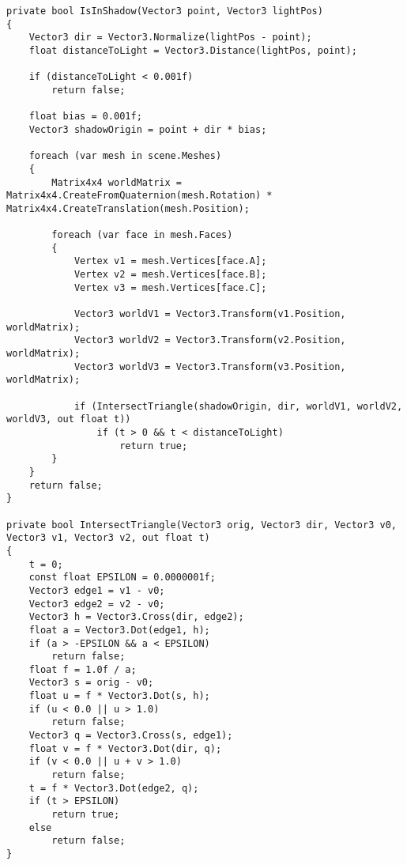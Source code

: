 \begin{center}
\captionsetup{justification=raggedright,singlelinecheck=off}
\begin{lstlisting}[label=lst:shadow,caption=Реализация алгоритма проверки затенения точки объектом,numbers=none]
private bool IsInShadow(Vector3 point, Vector3 lightPos)
{
    Vector3 dir = Vector3.Normalize(lightPos - point);
    float distanceToLight = Vector3.Distance(lightPos, point);

    if (distanceToLight < 0.001f)
        return false;

    float bias = 0.001f;
    Vector3 shadowOrigin = point + dir * bias;

    foreach (var mesh in scene.Meshes)
    {
        Matrix4x4 worldMatrix = Matrix4x4.CreateFromQuaternion(mesh.Rotation) * Matrix4x4.CreateTranslation(mesh.Position);

        foreach (var face in mesh.Faces)
        {
            Vertex v1 = mesh.Vertices[face.A];
            Vertex v2 = mesh.Vertices[face.B];
            Vertex v3 = mesh.Vertices[face.C];

            Vector3 worldV1 = Vector3.Transform(v1.Position, worldMatrix);
            Vector3 worldV2 = Vector3.Transform(v2.Position, worldMatrix);
            Vector3 worldV3 = Vector3.Transform(v3.Position, worldMatrix);

            if (IntersectTriangle(shadowOrigin, dir, worldV1, worldV2, worldV3, out float t))
                if (t > 0 && t < distanceToLight)
                    return true;
        }
    }
    return false;
}

private bool IntersectTriangle(Vector3 orig, Vector3 dir, Vector3 v0, Vector3 v1, Vector3 v2, out float t)
{
    t = 0;
    const float EPSILON = 0.0000001f;
    Vector3 edge1 = v1 - v0;
    Vector3 edge2 = v2 - v0;
    Vector3 h = Vector3.Cross(dir, edge2);
    float a = Vector3.Dot(edge1, h);
    if (a > -EPSILON && a < EPSILON)
        return false;
    float f = 1.0f / a;
    Vector3 s = orig - v0;
    float u = f * Vector3.Dot(s, h);
    if (u < 0.0 || u > 1.0)
        return false;
    Vector3 q = Vector3.Cross(s, edge1);
    float v = f * Vector3.Dot(dir, q);
    if (v < 0.0 || u + v > 1.0)
        return false;
    t = f * Vector3.Dot(edge2, q);
    if (t > EPSILON)
        return true;
    else
        return false;
}
\end{lstlisting}
\end{center}